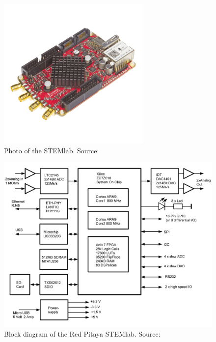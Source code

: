 \begin{figure}
    \centering
    \includegraphics[width=0.67\textwidth]{images/stl125/stemlab125-14-photo.png}
    \caption[STEMlab Photo]
        {Photo of the STEMlab. Source:~\cite{pita:elektor:starterkit}}
    \label{fig:stl125:photo}
\end{figure}

\begin{figure}
    \centering
    \includegraphics[width=\textwidth]{images/stl125/stemlab125.png}
    \caption[STEMlab Block Diagram]
        {Block diagram of the Red Pitaya STEMlab. Source:~\cite{pita:ossmann}}
    \label{fig:stl125:block_diagram}
\end{figure}

%
%
